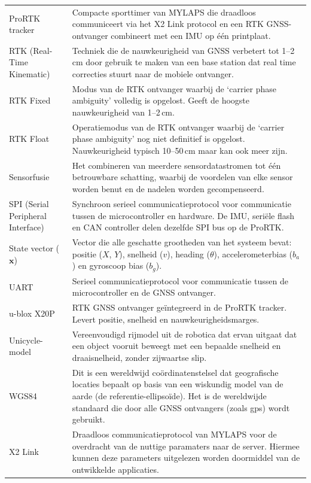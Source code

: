 \begin{longtable}{p{4.5cm} p{10cm}}
    ProRTK tracker &
    Compacte sporttimer van MYLAPS die draadloos communiceert
    via het X2 Link protocol en een RTK GNSS-ontvanger combineert
    met een IMU op één printplaat. \\

    RTK (Real-Time Kinematic) &
    Techniek die de nauwkeurigheid van GNSS verbetert tot
    1--2\,cm door gebruik te maken van een base station dat
    real time correcties stuurt naar de mobiele ontvanger. \\

    RTK Fixed &
    Modus van de RTK ontvanger waarbij de
    `carrier phase ambiguity' volledig is opgelost. Geeft de hoogste
    nauwkeurigheid van 1--2\,cm. \\

    RTK Float &
    Operatiemodus van de RTK ontvanger waarbij de
    `carrier phase ambiguity' nog niet definitief is opgelost.
    Nauwkeurigheid typisch 10--50\,cm maar kan ook meer zijn. \\

    Sensorfusie &
    Het combineren van meerdere sensordatastromen tot één
    betrouwbare schatting, waarbij de voordelen van elke sensor
    worden benut en de nadelen worden gecompenseerd. \\

    SPI (Serial Peripheral Interface) &
    Synchroon serieel communicatieprotocol voor communicatie
    tussen de microcontroller en hardware. De IMU,
    seriële flash en CAN controller delen dezelfde SPI bus
    op de ProRTK. \\

    State vector ($\mathbf{x}$) &
    Vector die alle geschatte grootheden van het systeem bevat:
    positie ($X$, $Y$), snelheid ($v$), heading ($\theta$),
    accelerometerbias ($b_a$) en gyroscoop bias ($b_g$). \\

    UART &
    Serieel communicatieprotocol voor communicatie tussen de
    microcontroller en de GNSS ontvanger. \\

    u-blox X20P &
    RTK GNSS ontvanger geïntegreerd in de ProRTK tracker.
    Levert positie, snelheid en nauwkeurigheidsmarges. \\

    Unicycle-model &
    Vereenvoudigd rijmodel uit de robotica dat ervan uitgaat dat
    een object vooruit beweegt met een bepaalde snelheid en
    draaisnelheid, zonder zijwaartse slip. \\

    WGS84 &
    Dit is een wereldwijd coördinatenstelsel dat geografische locaties bepaalt op basis van een wiskundig model van de aarde (de referentie-ellipsoïde). Het is de wereldwijde standaard die door alle GNSS ontvangers (zoals gps) wordt gebruikt. \\

    X2 Link &
    Draadloos communicatieprotocol van MYLAPS voor de overdracht
    van de nuttige paramaters naar de server. Hiermee kunnen deze parameters uitgelezen worden doormiddel van de ontwikkelde applicaties. \\

\end{longtable}